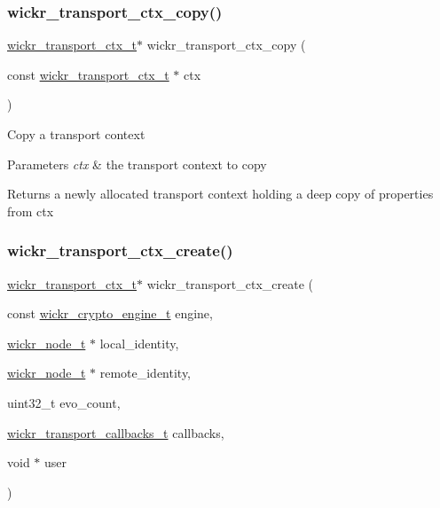 \subsubsection{\texorpdfstring{wickr\+\_\+transport\+\_\+ctx\+\_\+copy()}{wickr\_transport\_ctx\_copy()}}
{\footnotesize\ttfamily \hyperlink{structwickr__transport__ctx}{wickr\+\_\+transport\+\_\+ctx\+\_\+t}$\ast$ wickr\+\_\+transport\+\_\+ctx\+\_\+copy (\begin{DoxyParamCaption}\item[{const \hyperlink{structwickr__transport__ctx}{wickr\+\_\+transport\+\_\+ctx\+\_\+t} $\ast$}]{ctx }\end{DoxyParamCaption})}

Copy a transport context


\begin{DoxyParams}{Parameters}
{\em ctx} & the transport context to copy \\
\hline
\end{DoxyParams}
\begin{DoxyReturn}{Returns}
a newly allocated transport context holding a deep copy of properties from \textquotesingle{}ctx\textquotesingle{} 
\end{DoxyReturn}
\mbox{\label{group__wickr__transport__ctx_ga4731758cf20b71d4469c74904bf662c0}} 
\subsubsection{\texorpdfstring{wickr\+\_\+transport\+\_\+ctx\+\_\+create()}{wickr\_transport\_ctx\_create()}}
{\footnotesize\ttfamily \hyperlink{structwickr__transport__ctx}{wickr\+\_\+transport\+\_\+ctx\+\_\+t}$\ast$ wickr\+\_\+transport\+\_\+ctx\+\_\+create (\begin{DoxyParamCaption}\item[{const \hyperlink{structwickr__crypto__engine}{wickr\+\_\+crypto\+\_\+engine\+\_\+t}}]{engine,  }\item[{\hyperlink{structwickr__node}{wickr\+\_\+node\+\_\+t} $\ast$}]{local\+\_\+identity,  }\item[{\hyperlink{structwickr__node}{wickr\+\_\+node\+\_\+t} $\ast$}]{remote\+\_\+identity,  }\item[{uint32\+\_\+t}]{evo\+\_\+count,  }\item[{\hyperlink{structwickr__transport__callbacks}{wickr\+\_\+transport\+\_\+callbacks\+\_\+t}}]{callbacks,  }\item[{void $\ast$}]{user }\end{DoxyParamCaption})}

